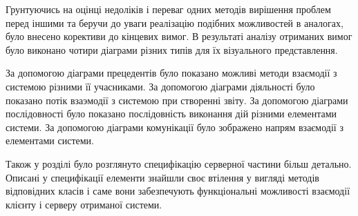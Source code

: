 \documentclass[../main.tex]{subfiles}
\begin{document}
	Грунтуючись на оцінці недоліків і переваг одних методів вирішення проблем перед іншими та беручи до уваги реалізацію подібних можливостей в аналогах, було внесено корективи до кінцевих вимог. В результаті аналізу отриманих вимог було виконано чотири діаграми різних типів для їх візуального представлення.
	
	За допомогою діаграми прецедентів було показано можливі методи взаємодії з системою різними її учасниками. За допомогою діаграми діяльності було показано потік взаэмодії з системою при створенні звіту. За допомогою діаграми послідовності було показано послідовність виконання дій різними елементами системи. За допомогою діаграми комунікації було зображено напрям взаємодії з елементами системи.
	
	Також у розділі було розглянуто специфікацію серверної частини більш детально. Описані у специфікації елементи знайшли своє втілення у вигляді методів відповідних класів і саме вони забезпечують функціональні можливості взаємодії клієнту і серверу отриманої системи. %
\end{document}
